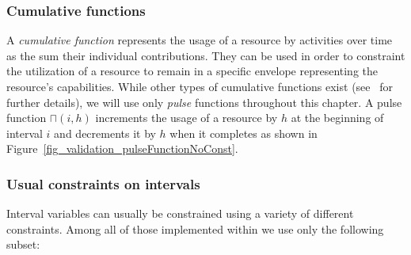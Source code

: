 \documentclass[main.tex]{subfiles}
\begin{document}
\subsubsection{Cumulative functions}
A \emph{cumulative function} represents the usage of a resource by activities over time as the sum their individual contributions. They can be used in order to constraint the utilization of a resource to remain in a specific envelope representing the resource's capabilities. While other types of cumulative functions exist (see~\cite{Laborie08, Laborie09} for further details), we will use only \emph{pulse} functions throughout this chapter. A pulse function $\sqcap(i, h)$ increments the usage of a resource by $h$ at the beginning of interval $i$ and decrements it by $h$ when it completes as shown in Figure~\ref{fig_validation_pulseFunctionNoConst}.




\subsubsection{Usual constraints on intervals}
Interval variables can usually be constrained using a variety of different constraints. Among all of those implemented within \CPOpti we use only the following subset:
\end{document}
